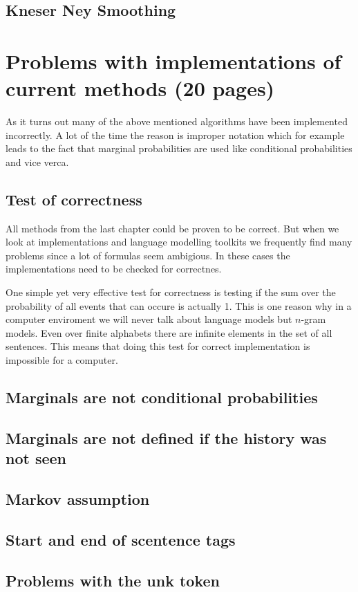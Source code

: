 \section{Kneser Ney Smoothing}

\chapter{Problems with implementations of current methods (20 pages)}
As it turns out many of the above mentioned algorithms have been implemented incorrectly. 
A lot of the time the reason is improper notation which for example leads to the fact that marginal probabilities are used like conditional probabilities and vice verca. 

\section{Test of correctness}
All methods from the last chapter could be proven to be correct.
But when we look at implementations and language modelling toolkits we frequently find many problems since a lot of formulas seem ambigious. 
In these cases the implementations need to be checked for correctnes. 

One simple yet very effective test for correctness is testing if the sum over the probability of all events that can occure is actually 1. 
This is one reason why in a computer enviroment we will never talk about language models but $n$-gram models. 
Even over finite alphabets there are infinite elements in the set of all sentences. 
This means that doing this test for correct implementation is impossible for a computer.
\section{Marginals are not conditional probabilities}
\section{Marginals are not defined if the history was not seen}
\section{Markov assumption}
\section{Start and end of scentence tags}
\section{Problems with the unk token}

